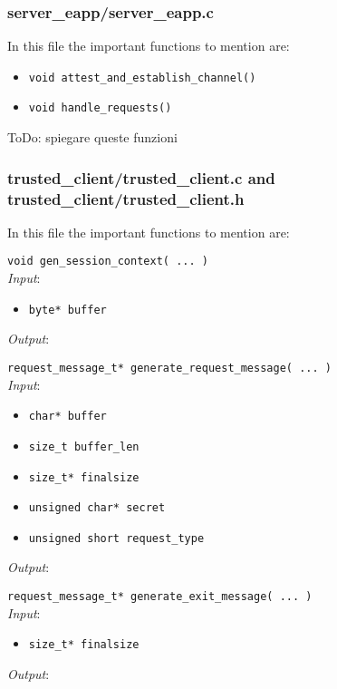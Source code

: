 \subsubsection{server\_eapp/server\_eapp.c}
In this file the important functions to mention are:
\begin{itemize}
  \item \texttt{void attest\_and\_establish\_channel()}
  \item \texttt{void handle\_requests()}
\end{itemize}
{\color{red} ToDo: spiegare queste funzioni}\\

\subsubsection{trusted\_client/trusted\_client.c and trusted\_client/trusted\_client.h}
In this file the important functions to mention are:

\noindent
\texttt{void gen\_session\_context( ... )}\\
\textit{Input}:
\begin{itemize}[noitemsep,nolistsep]
  \item \texttt{byte* buffer}
\end{itemize}
\textit{Output}: 


\noindent
\texttt{request\_message\_t* generate\_request\_message( ... )}\\
\textit{Input}:
\begin{itemize}[noitemsep,nolistsep]
  \item \texttt{char* buffer}
  \item \texttt{size\_t buffer\_len}
  \item \texttt{size\_t* finalsize}
  \item \texttt{unsigned char* secret}
  \item \texttt{unsigned short request\_type}
\end{itemize}
\textit{Output}: 


\noindent
\texttt{request\_message\_t* generate\_exit\_message( ... )}\\
\textit{Input}:
\begin{itemize}[noitemsep,nolistsep]
  \item \texttt{size\_t* finalsize}
\end{itemize}
\textit{Output}: 


   

